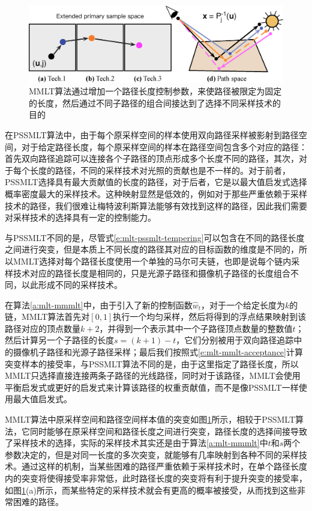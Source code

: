 \begin{figure}
	\includegraphics[width=1.0\textwidth]{figures/mlt/mmlt}
	\caption{MMLT算法通过增加一个路径长度控制参数，来使路径被限定为固定的长度，然后通过不同子路径的组合间接达到了选择不同采样技术的目的}
	\label{f:mlt-mmlt}
\end{figure}

在PSSMLT算法中，由于每个原采样空间的样本使用双向路径采样被影射到路径空间，对于给定路径长度，每个原采样空间的样本在路径空间包含多个对应的路径：首先双向路径追踪可以连接各个子路径的顶点形成多个长度不同的路径，其次，对于每个长度的路径，不同的采样技术对光照的贡献也是不一样的。对于前者，PSSMLT选择具有最大贡献值的长度的路径，对于后者，它是以最大值启发式选择概率密度最大的采样技术。这种映射显然是低效的，例如对于那些严重依赖于采样技术的路径，我们很难让梅特波利斯算法能够有效找到这样的路径，因此我们需要对采样技术的选择具有一定的控制能力。

与PSSMLT不同的是，尽管式\ref{e:mlt-pssmlt-tempering}可以包含在不同的路径长度之间进行突变，但是本质上不同长度的路径其对应的目标函数的维度是不同的，所以MMLT选择对每个路径长度使用一个单独的马尔可夫链，也即是说每个链内采样技术对应的路径长度是相同的，只是光源子路径和摄像机子路径的长度组合不同，以此形成不同的采样技术。

在算法\ref{a:mlt-mmmlt}中，由于引入了新的控制函数$\hat{w}_t$，对于一个给定长度为$k$的链，MMLT算法首先对$[0,1]$执行一个均匀采样，然后将得到的浮点结果映射到该路径对应的顶点数量$k+2$，并得到一个表示其中一个子路径顶点数量的整数值$t$；然后计算另一个子路径的长度$s=(k+1)-t$，它们分别被用于双向路径追踪中的摄像机子路径和光源子路径采样；最后我们按照式\ref{e:mlt-mmlt-acceptance}计算突变样本的接受率，与PSSMLT算法不同的是，由于这里指定了路径长度，所以MMLT只选择直接连接两条子路径的光线路径，同时对于该路径，MMLT会使用平衡启发式或更好的启发式来计算该路径的权重贡献值，而不是像PSSMLT一样使用最大值启发式。

MMLT算法\cite{m:MMLT}中原采样空间和路径空间样本值的突变如图\ref{f:mlt-mmlt}所示，相较于PSSMLT算法，它同时能够在原采样空间和路径长度之间进行突变，路径长度的选择间接导致了采样技术的选择，实际的采样技术其实还是由于算法\ref{a:mlt-mmmlt}中$t$和$s$两个参数决定的，但是对同一长度的多次突变，就能够有几率映射到各种不同的采样技术。通过这样的机制，当某些困难的路径严重依赖于采样技术时，在单个路径长度内的突变将使得接受率非常低，此时路径长度的突变将有利于提升突变的接受率，如图\ref{f:mlt-mmlt}(a)所示，而某些特定的采样技术就会有更高的概率被接受，从而找到这些非常困难的路径。






